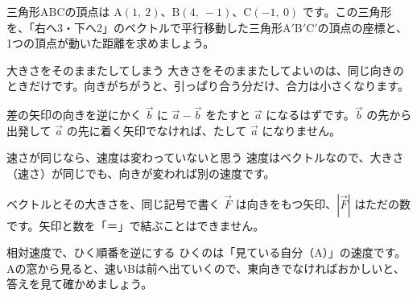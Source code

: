 \begin{jibun}
三角形ABCの頂点は $\mathrm{A}(1,\ 2)$、$\mathrm{B}(4,\ -1)$、$\mathrm{C}(-1,\ 0)$ です。この三角形を、「右へ3・下へ2」のベクトルで平行移動した三角形A$'$B$'$C$'$の頂点の座標と、1つの頂点が動いた距離を求めましょう。
\end{jibun}


\begin{tsumazuki}{大きさをそのままたしてしまう}
大きさをそのままたしてよいのは、同じ向きのときだけです。向きがちがうと、引っぱり合う分だけ、合力は小さくなります。
\end{tsumazuki}

\begin{tsumazuki}{差の矢印の向きを逆にかく}
$\vec{b}$ に $\vec{a}-\vec{b}$ をたすと $\vec{a}$ になるはずです。$\vec{b}$ の先から出発して $\vec{a}$ の先に着く矢印でなければ、たして $\vec{a}$ になりません。
\end{tsumazuki}

\begin{tsumazuki}{速さが同じなら、速度は変わっていないと思う}
速度はベクトルなので、大きさ（速さ）が同じでも、向きが変われば別の速度です。
\end{tsumazuki}

\begin{tsumazuki}{ベクトルとその大きさを、同じ記号で書く}
$\vec{F}$ は向きをもつ矢印、$|\vec{F}|$ はただの数です。矢印と数を「＝」で結ぶことはできません。
\end{tsumazuki}

\begin{tsumazuki}{相対速度で、ひく順番を逆にする}
ひくのは「見ている自分（A）」の速度です。Aの窓から見ると、速いBは前へ出ていくので、東向きでなければおかしいと、答えを見て確かめましょう。
\end{tsumazuki}

